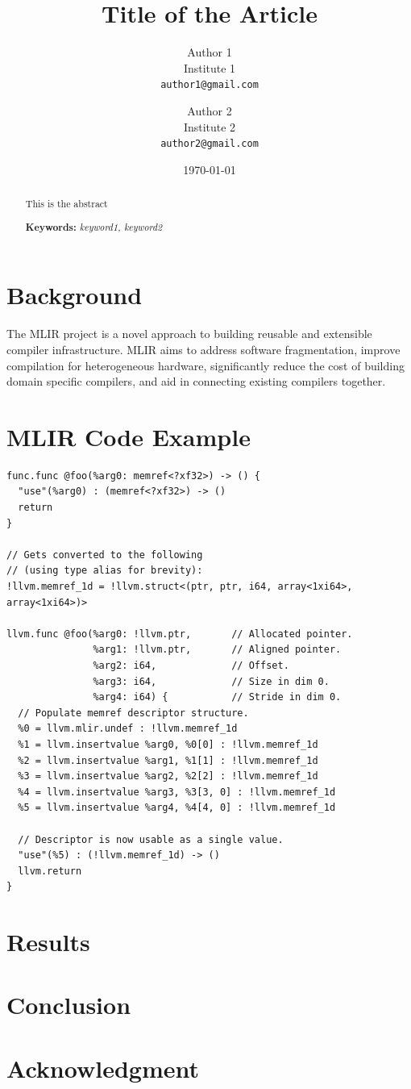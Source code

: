 \documentclass[a4paper,12pt]{article}
\author{
  Author 1 \\
  Institute 1 \\
  \texttt{author1@gmail.com}
  \and
  Author 2 \\
  Institute 2 \\  
  \texttt{author2@gmail.com}
}
\date{\today}
\title{\textbf{Title of the Article}}
\begin{document}
\maketitle

\begin{abstract}
  This is the abstract

  \textbf{Keywords:} \textit{keyword1, keyword2}
\end{abstract}

\section{Background}
The MLIR project \cite{10.1109/CGO51591.2021.9370308} is a novel approach to building reusable 
and extensible compiler infrastructure. 
MLIR aims to address software fragmentation, 
improve compilation for heterogeneous hardware, 
significantly reduce the cost of building domain specific compilers, 
and aid in connecting existing compilers together.

\section{MLIR Code Example}
\begin{lstlisting}[style=MyMLIR]
func.func @foo(%arg0: memref<?xf32>) -> () {
  "use"(%arg0) : (memref<?xf32>) -> ()
  return
}

// Gets converted to the following
// (using type alias for brevity):
!llvm.memref_1d = !llvm.struct<(ptr, ptr, i64, array<1xi64>, array<1xi64>)>

llvm.func @foo(%arg0: !llvm.ptr,       // Allocated pointer.
               %arg1: !llvm.ptr,       // Aligned pointer.
               %arg2: i64,             // Offset.
               %arg3: i64,             // Size in dim 0.
               %arg4: i64) {           // Stride in dim 0.
  // Populate memref descriptor structure.
  %0 = llvm.mlir.undef : !llvm.memref_1d
  %1 = llvm.insertvalue %arg0, %0[0] : !llvm.memref_1d
  %2 = llvm.insertvalue %arg1, %1[1] : !llvm.memref_1d
  %3 = llvm.insertvalue %arg2, %2[2] : !llvm.memref_1d
  %4 = llvm.insertvalue %arg3, %3[3, 0] : !llvm.memref_1d
  %5 = llvm.insertvalue %arg4, %4[4, 0] : !llvm.memref_1d

  // Descriptor is now usable as a single value.
  "use"(%5) : (!llvm.memref_1d) -> ()
  llvm.return
}
\end{lstlisting}


\section{Results}

\section{Conclusion}

\section{Acknowledgment}

\pagestyle{plain}
\printbibliography
\end{document}

